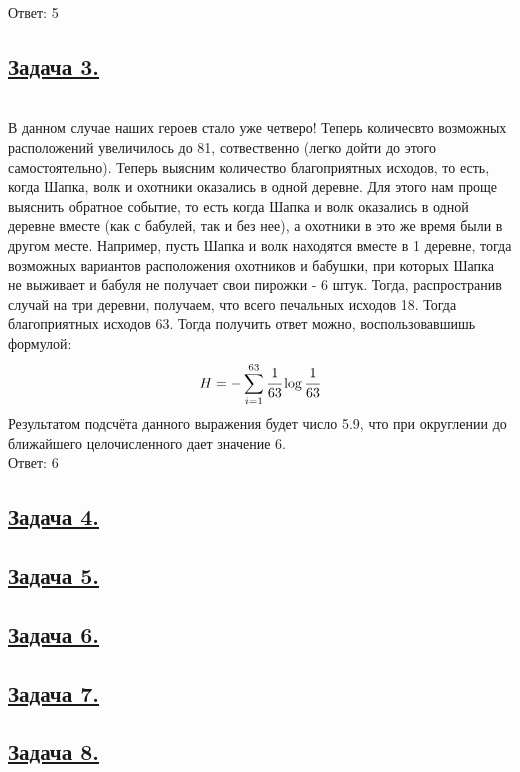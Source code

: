 Ответ: 5

\subsection*{\hyperref[sec:problem3]{Задача 3.}}
\label{sec:sol_problem3} \
\\ 

В данном случае наших героев стало уже четверо! Теперь количесвто возможных расположений увеличилось до 81, сотвественно (легко дойти до этого самостоятельно). Теперь выясним количество благоприятных исходов, то есть, когда Шапка, волк и охотники оказались в одной деревне. Для этого нам проще выяснить обратное событие, то есть когда Шапка и волк оказались в одной деревне вместе (как с бабулей, так и без нее), а охотники в это же время были в другом месте. Например, пусть Шапка и волк находятся вместе в 1 деревне, тогда возможных вариантов расположения охотников и бабушки, при которых Шапка не выживает и бабуля не получает свои пирожки - 6 штук. Тогда, распространив случай  на три деревни, получаем, что всего печальных исходов 18. Тогда благоприятных исходов 63. Тогда получить ответ можно, воспользовавшишь формулой: 
\[H=-\sum\limits_{i=1}^{63}  \cfrac{1}{63}\log \cfrac{1}{63} \]
Результатом подсчёта данного выражения будет число 5.9, что при округлении до ближайшего целочисленного дает значение 6. \\

Ответ: 6
\subsection*{\hyperref[sec:problem4]{Задача 4.}}
\label{sec:sol_problem4}

\subsection*{\hyperref[sec:problem5]{Задача 5.}}\label{sec:sol_problem5}

\subsection*{\hyperref[sec:problem6]{Задача 6.}}\label{sec:sol_problem6}

\subsection*{\hyperref[sec:problem7]{Задача 7.}}\label{sec:sol_problem7}

\subsection*{\hyperref[sec:problem8]{Задача 8.}}\label{sec:sol_problem8}